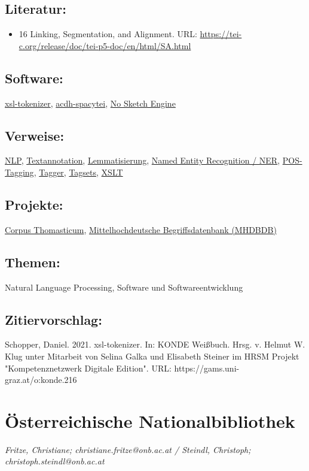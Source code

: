 \documentclass{article}
\begin{document}
        \subsection*{Literatur:}\begin{itemize}\item 16 Linking, Segmentation, and Alignment. URL: \url{https://tei-c.org/release/doc/tei-p5-doc/en/html/SA.html}\end{itemize}\subsection*{Software:}\href{https://github.com/acdh-oeaw/xsl-tokenizer}{xsl-tokenizer}, \href{https://github.com/acdh-oeaw/acdh-spacytei}{acdh-spacytei}, \href{https://nlp.fi.muni.cz/trac/noske}{No Sketch
                           Engine }\subsection*{Verweise:}\href{https://gams.uni-graz.at/o:konde.145}{NLP}, \href{https://gams.uni-graz.at/o:konde.17}{Textannotation}, \href{https://gams.uni-graz.at/o:konde.115}{Lemmatisierung}, \href{https://gams.uni-graz.at/o:konde.141}{Named Entity Recognition /
                           NER}, \href{https://gams.uni-graz.at/o:konde.156}{POS-Tagging}, \href{https://gams.uni-graz.at/o:konde.176}{Tagger}, \href{https://gams.uni-graz.at/o:konde.177}{Tagsets}, \href{https://gams.uni-graz.at/o:konde.86}{XSLT}\subsection*{Projekte:}\href{https://www.corpusthomisticum.org/wintrode.html}{Corpus
                           Thomasticum}, \href{http://mhdbdb.sbg.ac.at/}{Mittelhochdeutsche
                           Begriffsdatenbank (MHDBDB)}\subsection*{Themen:}Natural Language Processing, Software und Softwareentwicklung\subsection*{Zitiervorschlag:}Schopper, Daniel. 2021. xsl-tokenizer. In: KONDE Weißbuch. Hrsg. v. Helmut W. Klug unter Mitarbeit von Selina Galka und Elisabeth Steiner im HRSM Projekt "Kompetenznetzwerk Digitale Edition". URL: https://gams.uni-graz.at/o:konde.216\newpage\section*{Österreichische Nationalbibliothek} \emph{Fritze, Christiane; christiane.fritze@onb.ac.at / Steindl, Christoph;
                  christoph.steindl@onb.ac.at }\\
        
\end{document}
